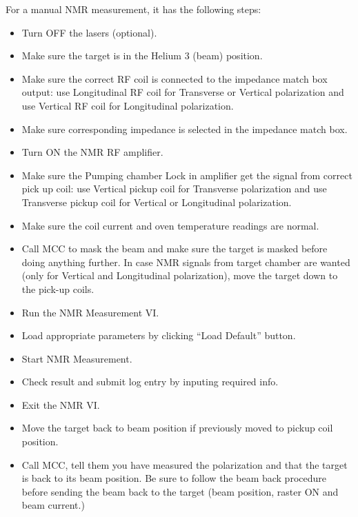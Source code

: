 {For a manual NMR measurement, it has the following steps:
\begin{itemize}
\item Turn OFF the lasers (optional).
\item Make sure the target is in the Helium 3 (beam) position.
\item Make sure the correct RF coil is connected to the
  impedance match box output: use Longitudinal RF coil for
  Transverse or Vertical polarization and use Vertical RF coil for
  Longitudinal polarization.
\item Make sure corresponding impedance is selected in the impedance
  match box.
\item Turn ON the NMR RF amplifier.
\item Make sure the Pumping chamber Lock in amplifier get the signal
  from correct pick up coil: use Vertical pickup coil for Transverse
  polarization and use Transverse pickup coil for Vertical or 
  Longitudinal polarization.
\item Make sure the coil current and oven temperature readings are normal.
\item Call MCC to mask the beam and make sure the target is masked
  before doing anything further. 
  In case NMR signals from target chamber are wanted (only for
  Vertical and Longitudinal polarization), move the target down to the 
  pick-up coils.
\item Run the NMR Measurement VI.
\item Load appropriate parameters by clicking ``Load Default'' button.
\item Start NMR Measurement.
\item Check result and submit log entry by inputing required info.
\item Exit the NMR VI.
\item Move the target back to beam position if previously moved to
  pickup coil position.
\item Call MCC, tell them you have measured the polarization and that 
  the target is back to its beam position. 
  Be sure to follow the beam back procedure before sending the beam
  back to the target (beam position, raster ON and beam current.)
\end{itemize}


}
